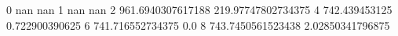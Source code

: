 0 nan nan
1 nan nan
2 961.6940307617188 219.97747802734375
4 742.439453125 0.722900390625
6 741.716552734375 0.0
8 743.7450561523438 2.02850341796875
